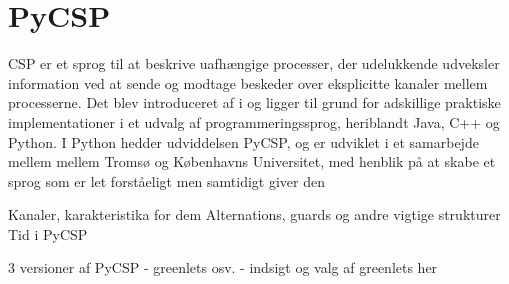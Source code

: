 \chapter{PyCSP}
CSP er et sprog til at beskrive uafhængige processer, der udelukkende udveksler information ved at sende og modtage beskeder over eksplicitte kanaler mellem processerne. Det blev introduceret af \citeauthor{hoare-csp} i \cite{hoare-csp} og ligger til grund for adskillige praktiske implementationer i et udvalg af programmeringssprog, heriblandt Java, C++ og Python. I Python hedder udviddelsen PyCSP, og er udviklet i et samarbejde mellem mellem Tromsø og Københavns Universitet, med henblik på at skabe et sprog som er let forståeligt men samtidigt giver den \cite{pycsp}






Kanaler, karakteristika for dem
Alternations, guards og andre vigtige strukturer
Tid i PyCSP

3 versioner af PyCSP - greenlets osv.
 - indsigt og valg af greenlets her






